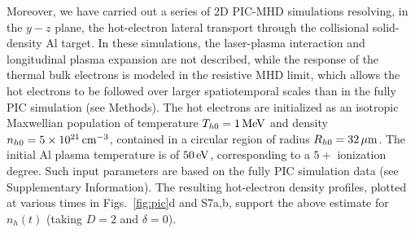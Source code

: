 \documentclass[aps,twocolumn,showpacs,superscriptaddress]{revtex4}
\begin{document}
Moreover, we have carried out a series of 2D PIC-MHD simulations resolving, in the $y-z$ plane, the hot-electron lateral transport through the collisional solid-density Al target. In these simulations, the laser-plasma interaction and longitudinal plasma expansion are not described, while the response of the thermal bulk electrons is modeled in the resistive MHD limit, which allows the hot electrons to be followed over larger spatiotemporal scales than in the fully PIC simulation (see Methods). The hot electrons are initialized as an isotropic Maxwellian population of temperature $T_{h0}=1\,\rm MeV$ and density $n_{h0}=5\times10^{21}\,\rm cm^{-3}$, contained in a circular region of radius $R_{h0}=32\,\rm \mu m$. The initial Al plasma temperature is of $50\,\rm eV$, corresponding to a $5+$ ionization degree. Such input parameters are based on the fully PIC simulation data (see Supplementary Information). The resulting hot-electron density profiles, plotted at various times in Figs.~\ref{fig:pic}d and S7a,b, support the above estimate for $n_h(t)$ (taking $D=2$ and $\delta=0$).
\end{document}
